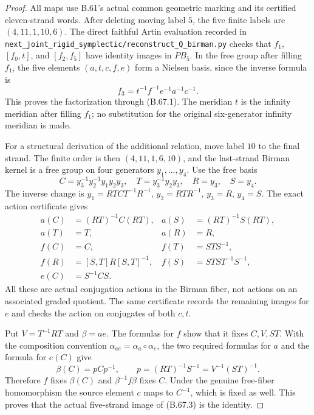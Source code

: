 \begin{proof}
All maps use B.61's actual common geometric marking
and its certified eleven-strand words.
After deleting moving label $5$, the five finite labels
are $(4,11,1,10,6)$.
The direct faithful Artin evaluation recorded in
\nolinkurl{next_joint_rigid_symplectic/reconstruct_Q_birman.py}
checks that $f_1$, $[f_0,t]$, and $[f_2,f_5]$ have
identity images in $PB_5$.
In the free group after filling $f_1$, the five elements
$(a,t,c,f,e)$ form a Nielsen basis, since the inverse
formula is
\[
                 f_3=t^{-1}f^{-1}e^{-1}a^{-1}c^{-1}.
                                                               \tag{B.67.4}
\]
This proves the factorization through (B.67.1).
The meridian $t$ is the infinity meridian after filling
$f_1$; no substitution for the original six-generator
infinity meridian is made.

For a structural derivation of the additional relation,
move label $10$ to the final strand.  The finite order
is then $(4,11,1,6,10)$, and the last-strand Birman
kernel is a free group on four generators $y_1,\ldots,y_4$.
Use the free basis
\[
 C=y_3^{-1}y_2^{-1}y_1y_2y_3,\quad
 T=y_3^{-1}y_2y_3,\quad R=y_3,\quad S=y_4.
                                                               \tag{B.67.5}
\]
The inverse change is
$y_1=RTC T^{-1}R^{-1}$, $y_2=RTR^{-1}$,
$y_3=R$, $y_4=S$.
The exact action certificate gives
\begin{align*}
 a(C)&=(RT)^{-1}C(RT),& a(S)&=(RT)^{-1}S(RT),\\
 a(T)&=T,&a(R)&=R,\\
 f(C)&=C,&f(T)&=STS^{-1},\\
 f(R)&=[S,T]R[S,T]^{-1},&
 f(S)&=STS T^{-1}S^{-1},\\
 e(C)&=S^{-1}CS.&&
                                                               \tag{B.67.6}
\end{align*}
All these are actual conjugation actions in the Birman
fiber, not actions on an associated graded quotient.
The same certificate records the remaining images for
$e$ and checks the action on conjugates of both $c,t$.

Put $V=T^{-1}RT$ and $\beta=ae$.
The formulas for $f$ show that it fixes $C,V,ST$.
With the composition convention
$\alpha_{ae}=\alpha_a\circ\alpha_e$, the two required
formulas for $a$ and the formula for $e(C)$ give
\[
 \beta(C)=pCp^{-1},\qquad
 p=(RT)^{-1}S^{-1}=V^{-1}(ST)^{-1}.
                                                               \tag{B.67.7}
\]
Therefore $f$ fixes $\beta(C)$ and
$\beta^{-1}f\beta$ fixes $C$.
Under the genuine free-fiber homomorphism the source
element $c$ maps to $C^{-1}$, which is fixed as well.
This proves that the actual five-strand image of
(B.67.3) is the identity.


\end{proof}
